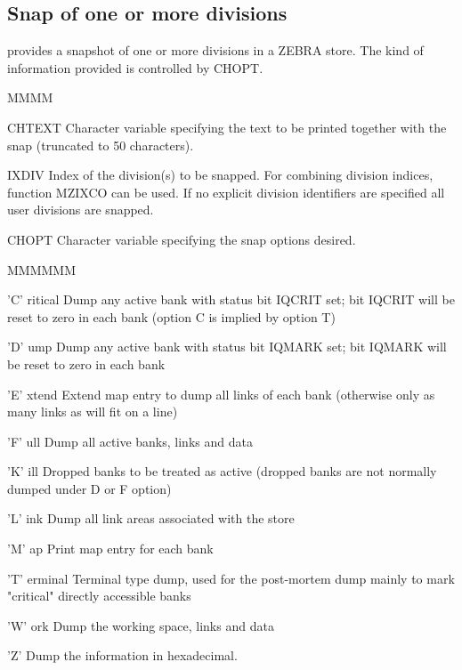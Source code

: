 \subsection{Snap of one or more divisions}
\par {} provides a snapshot of one or more divisions in a ZEBRA
store. The kind of information provided is controlled by CHOPT.
\Idesc
\begin{DL}{MMMM}
\item[CHTEXT]Character variable specifying the text to be printed
together with the snap (truncated to 50 characters).
\item[IXDIV]Index of the division(s) to be snapped.
\newline For combining division indices, function MZIXCO can be used.
\newline If no explicit division identifiers are specified
all user divisions are snapped.
\item[CHOPT]Character variable specifying the snap options desired.
\begin{DL}{MMMMMM}
\item['C' ritical]Dump any active bank with status bit IQCRIT set;
bit IQCRIT will be reset to zero in each bank
(option C is implied by option T)
\item['D' ump]Dump any active bank with status bit IQMARK set;
bit IQMARK will be reset to zero in each bank
\item['E' xtend]Extend map entry to dump all links of each bank
(otherwise only as many links as will fit on a line)
\item['F' ull]Dump all active banks, links and data
\item['K' ill]Dropped banks to be treated as active
(dropped banks are not normally dumped under D or F option)
\item['L' ink]Dump all link areas associated with the store
\item['M' ap]Print map entry for each bank
\item['T' erminal]Terminal type dump, used for the post-mortem dump
mainly to mark "critical" directly accessible banks
\item['W' ork]Dump the working space, links and data
\item['Z']Dump the information in hexadecimal.
\end{DL}
\end{DL}
